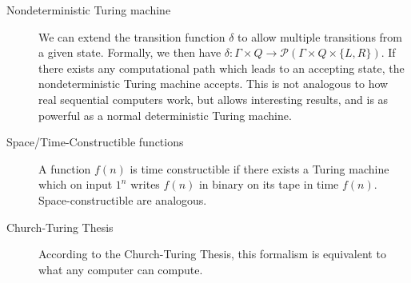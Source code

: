 \begin{description}
    \item[Nondeterministic Turing machine] We can extend the transition function $\delta$ to allow multiple transitions from a given state.
    Formally, we then have $\delta : \Gamma \times Q \to \mathcal{P}(\Gamma \times Q \times \{L, R\})$.
    If there exists any computational path which leads to an accepting state, the nondeterministic Turing machine accepts.
    This is not analogous to how real sequential computers work, but allows interesting results, and is as powerful as a normal deterministic Turing machine.
    \item[Space/Time-Constructible functions] A function $f(n)$ is time constructible if there exists a Turing machine which on input $1^{n}$ writes $f(n)$ in binary on its tape in time $f(n)$.
    Space-constructible are analogous.
    \item[Church-Turing Thesis] According to the Church-Turing Thesis, this formalism is equivalent to what any computer can compute.
\end{description}
